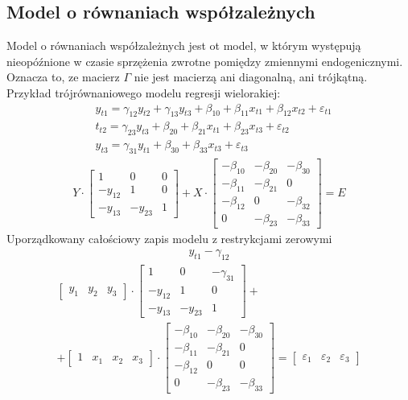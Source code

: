 \subsection{Model o równaniach współzależnych}
Model o równaniach współzależnych jest ot model, w którym występują nieopóźnione w czasie sprzężenia zwrotne pomiędzy zmiennymi endogenicznymi. Oznacza to, ze macierz $ \Gamma $ nie jest macierzą ani diagonalną, ani trójkątną.\\
Przykład trójrównaniowego modelu regresji wielorakiej:
\begin{align*}
&y_{t1}=\gamma_{12}y_{t2}+\gamma_{13}y_{t3}+\beta_{10}+\beta_{11}x_{t1}+\beta_{12}x_{t2}+\varepsilon_{t1}\\
&t_{t2}=\gamma_{23}y_{t3}+\beta_{20}+\beta_{21}x_{t1}+\beta_{23}x_{t3}+\varepsilon_{t2}\\
&y_{t3}=\gamma_{31}y_{t1}+\beta_{30}+\beta_{33}x_{t3}+\varepsilon_{t3}
\end{align*}
\begin{gather*}
Y\cdot
\begin{bmatrix}
	   1    &    0    & 0 \\
	-y_{12} &    1    & 0 \\
	-y_{13} & -y_{23} & 1
\end{bmatrix}
+X\cdot
\begin{bmatrix}
	-\beta _{10} & -\beta _{20} & -\beta _{30} \\
	-\beta _{11} & -\beta _{21} & 0            \\
	-\beta _{12} & 0            & -\beta _{32} \\
	0            & -\beta _{23} & -\beta _{33}
\end{bmatrix}
=E
\end{gather*}
Uporządkowany całościowy zapis modelu z restrykcjami zerowymi
\begin{gather*}
y_{t1}-\gamma_{12}
\end{gather*}
\begin{gather*}
\begin{bmatrix}
	y_1 & y_2 & y_3
\end{bmatrix}
\cdot
\begin{bmatrix}
	   1    &    0    & -\gamma_{31} \\
	-y_{12} &    1    & 0 \\
	-y_{13} & -y_{23} & 1
\end{bmatrix}
+\\+
\begin{bmatrix}
	1 & x_1 & x_2 & x_3
\end{bmatrix}
\cdot
\begin{bmatrix}
	-\beta _{10} & -\beta _{20} & -\beta _{30} \\
	-\beta _{11} & -\beta _{21} & 0            \\
	-\beta _{12} & 0            & 0            \\
	0            & -\beta _{23} & -\beta _{33}
\end{bmatrix}
=
\begin{bmatrix}
\varepsilon_1&\varepsilon_2&\varepsilon_3
\end{bmatrix}
\end{gather*}

